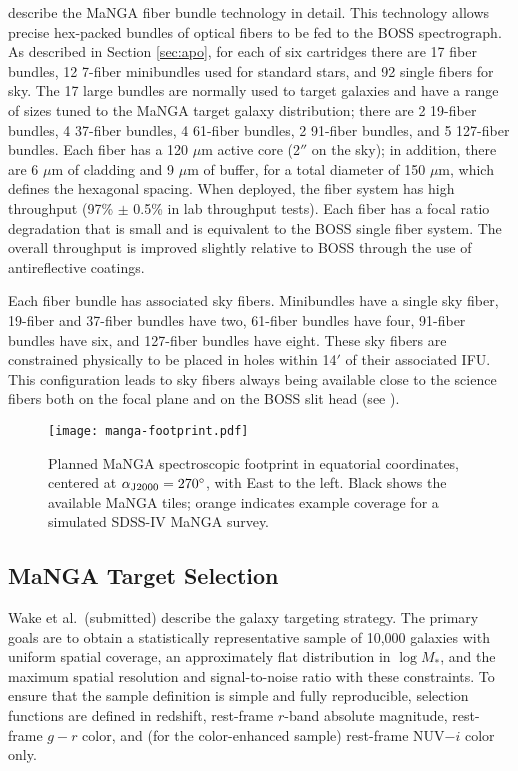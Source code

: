 \citet{drory15a} describe the MaNGA fiber bundle technology in
detail. This technology allows precise hex-packed bundles of optical
fibers to be fed to the BOSS spectrograph. As described in Section
\ref{sec:apo}, for each of six cartridges there are 17 fiber bundles,
12 7-fiber minibundles used for standard stars, and 92 single fibers
for sky. The 17 large bundles are normally used to target galaxies and
have a range of sizes tuned to the MaNGA target galaxy distribution;
there are 2 19-fiber bundles, 4 37-fiber bundles, 4 61-fiber bundles, 2
91-fiber bundles, and 5 127-fiber bundles. Each fiber has a 120 $\mu$m
active core (2$''$ on the sky); in addition, there are 6 $\mu$m of
cladding and 9 $\mu$m of buffer, for a total diameter of 150 $\mu$m,
which defines the hexagonal spacing. When deployed, the fiber system
has high throughput (97\% $\pm$ 0.5\% in lab throughput tests).
Each fiber has a focal ratio degradation that is small and is
equivalent to the BOSS single fiber system. The overall throughput is
improved slightly relative to BOSS through the use of antireflective
coatings.

Each fiber bundle has associated sky fibers. Minibundles have
a single sky fiber, 19-fiber and 37-fiber bundles have two, 61-fiber
bundles have four, 91-fiber bundles have six, and 127-fiber bundles
have eight.  These sky fibers are constrained physically to be placed
in holes within 14$'$ of their associated IFU. This
configuration leads to sky fibers always being available close to the
science fibers both on the focal plane and on the BOSS slit head (see
\citealt{law16a}).

\begin{figure}[t!]
\centering
\texttt{[image: manga-footprint.pdf]}
\caption{ \label{fig:manga-footprint} Planned MaNGA spectroscopic
  footprint in equatorial coordinates, centered at $\alpha_{\rm
    J2000}=270^\circ$, with East to the left.  Black shows the
  available MaNGA tiles; orange indicates example coverage for a
  simulated SDSS-IV MaNGA survey.}
\end{figure}

\subsection{MaNGA Target Selection}

Wake et al.~(submitted) describe the galaxy targeting
strategy. The primary goals are to obtain a statistically
representative sample of 10,000 galaxies with uniform spatial
coverage, an approximately flat distribution in $\log M_\ast$, and the
maximum spatial resolution and signal-to-noise ratio with these
constraints. To ensure that the sample definition is simple and fully
reproducible, selection functions are defined in redshift, rest-frame
$r$-band absolute magnitude, rest-frame $g-r$ color, and (for the
color-enhanced sample) rest-frame NUV$-i$ color only.

